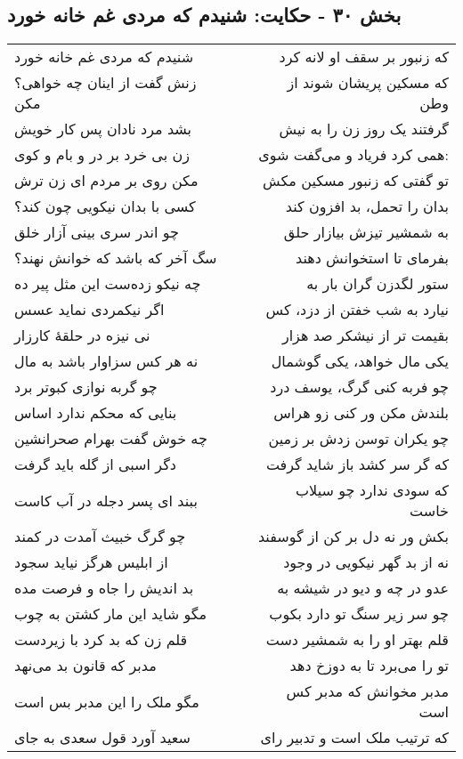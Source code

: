 \begin{center}
\section*{بخش ۳۰ - حکایت: شنیدم که مردی غم خانه خورد}
\label{sec:030}
\begin{longtable}{l p{0.5cm} r}
شنیدم که مردی غم خانه خورد
&&
که زنبور بر سقف او لانه کرد
\\
زنش گفت از اینان چه خواهی؟ مکن
&&
که مسکین پریشان شوند از وطن
\\
بشد مرد نادان پس کار خویش
&&
گرفتند یک روز زن را به نیش
\\
زن بی خرد بر در و بام و کوی
&&
همی کرد فریاد و می‌گفت شوی:
\\
مکن روی بر مردم ای زن ترش
&&
تو گفتی که زنبور مسکین مکش
\\
کسی با بدان نیکویی چون کند؟
&&
بدان را تحمل، بد افزون کند
\\
چو اندر سری بینی آزار خلق
&&
به شمشیر تیزش بیازار حلق
\\
سگ آخر که باشد که خوانش نهند؟
&&
بفرمای تا استخوانش دهند
\\
چه نیکو زده‌ست این مثل پیر ده
&&
ستور لگدزن گران بار به
\\
اگر نیکمردی نماید عسس
&&
نیارد به شب خفتن از دزد، کس
\\
نی نیزه در حلقهٔ کارزار
&&
بقیمت تر از نیشکر صد هزار
\\
نه هر کس سزاوار باشد به مال
&&
یکی مال خواهد، یکی گوشمال
\\
چو گربه نوازی کبوتر برد
&&
چو فربه کنی گرگ، یوسف درد
\\
بنایی که محکم ندارد اساس
&&
بلندش مکن ور کنی زو هراس
\\
چه خوش گفت بهرام صحرانشین
&&
چو یکران توسن زدش بر زمین
\\
دگر اسبی از گله باید گرفت
&&
که گر سر کشد باز شاید گرفت
\\
ببند ای پسر دجله در آب کاست
&&
که سودی ندارد چو سیلاب خاست
\\
چو گرگ خبیث آمدت در کمند
&&
بکش ور نه دل بر کن از گوسفند
\\
از ابلیس هرگز نیاید سجود
&&
نه از بد گهر نیکویی در وجود
\\
بد اندیش را جاه و فرصت مده
&&
عدو در چه و دیو در شیشه به
\\
مگو شاید این مار کشتن به چوب
&&
چو سر زیر سنگ تو دارد بکوب
\\
قلم زن که بد کرد با زیردست
&&
قلم بهتر او را به شمشیر دست
\\
مدبر که قانون بد می‌نهد
&&
تو را می‌برد تا به دوزخ دهد
\\
مگو ملک را این مدبر بس است
&&
مدبر مخوانش که مدبر کس است
\\
سعید آورد قول سعدی به جای
&&
که ترتیب ملک است و تدبیر رای
\\
\end{longtable}
\end{center}
